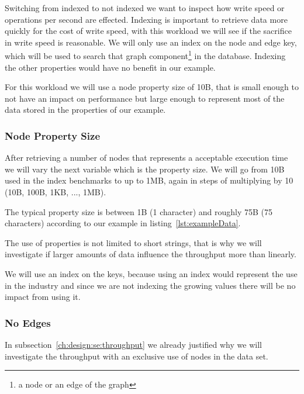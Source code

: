 Switching from indexed to not indexed we want to inspect how write speed or operations per second are effected.
Indexing is important to retrieve data more quickly for the cost of write speed,
with this workload we will see if the sacrifice in write speed is reasonable.
We will only use an index on the node and edge key,
which will be used to search that graph component\footnote{a node or an edge of the graph} in the database.
Indexing the other properties would have no benefit in our example. 

For this workload we will use a node property size of 10B,
that is small enough to not have an impact on performance but large enough to represent most of the data stored in the properties of our example.

\subsubsection{Node Property Size}
\label{ch:design:se:nodePropertySize}
After retrieving a number of nodes that represents a acceptable execution time we will vary the next variable which is the property size.
We will go from 10B used in the index benchmarks to up to 1MB,
again in steps of multiplying by 10 (10B, 100B, 1KB, ..., 1MB).

The typical property size is between 1B (1 character) and roughly 75B (75 characters) according to our example in listing~\ref{lst:exampleData}.

The use of properties is not limited to short strings,
that is why we will investigate if larger amounts of data influence the throughput more than linearly.

We will use an index on the keys,
because using an index would represent the use in the industry and since we are not indexing the growing values there will be no impact from using it.

\subsubsection{No Edges}
\label{ch:design:se:noEdges}
In subsection~\ref{ch:design:se:throughput} we already justified why we will investigate the throughput with an exclusive use of nodes in the data set.

